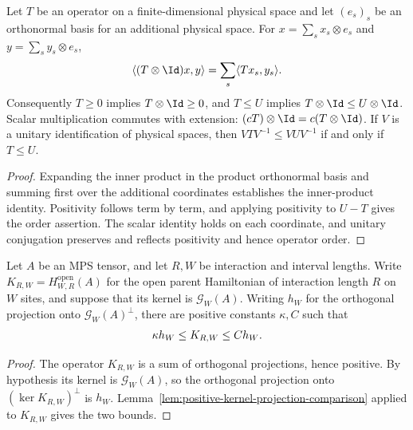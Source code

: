 \begin{lemma}
    \label{thm:ph_spectator_operator_order}
    \leanok
    Let $T$ be an operator on a finite-dimensional physical space and
    let $(e_s)_s$ be an orthonormal basis for an additional physical space.
    For $x=\sum_s x_s\otimes e_s$ and $y=\sum_s y_s\otimes e_s$,
    \begin{align}
        \langle (T\otimes\Id)x,y\rangle
        =\sum_s\langle Tx_s,y_s\rangle.
        \notag
    \end{align}
    Consequently $T\ge0$ implies $T\otimes\Id\ge0$, and $T\le U$ implies
    $T\otimes\Id\le U\otimes\Id$. Scalar multiplication commutes with
    extension: $(cT)\otimes\Id=c(T\otimes\Id)$.
    If $V$ is a unitary identification of physical spaces, then
    $VTV^{-1}\le VUV^{-1}$ if and only if $T\le U$.
\end{lemma}
\begin{proof}
    \leanok
    Expanding the inner product in the product orthonormal basis and summing
    first over the additional coordinates establishes the inner-product
    identity. Positivity follows term by term, and applying positivity to
    $U-T$ gives the order assertion. The scalar identity holds on each
    coordinate, and unitary conjugation preserves and reflects positivity and
    hence operator order.
\end{proof}

\begin{lemma}
    \label{lem:parent-finite-interval-comparison}
    \leanok
    Let $A$ be an MPS tensor, and let $R,W$ be interaction and interval lengths.
    Write $K_{R,W}=H^{\mathrm{open}}_{W,R}(A)$ for the open parent Hamiltonian
    of interaction length $R$ on $W$ sites, and suppose that its kernel is
    $\mathcal G_W(A)$. Writing $h_W$ for the orthogonal projection onto
    $\mathcal G_W(A)^\perp$, there are positive constants $\kappa,C$ such that
    \begin{align}
        \kappa h_W \leq K_{R,W} \leq C h_W.
        \notag
    \end{align}
\end{lemma}
\begin{proof}
    \leanok
    The operator $K_{R,W}$ is a sum of orthogonal projections, hence
    positive. By hypothesis its kernel is $\mathcal G_W(A)$, so the
    orthogonal projection onto $(\ker K_{R,W})^\perp$ is $h_W$.
    Lemma~\ref{lem:positive-kernel-projection-comparison} applied to
    $K_{R,W}$ gives the two bounds.
\end{proof}


